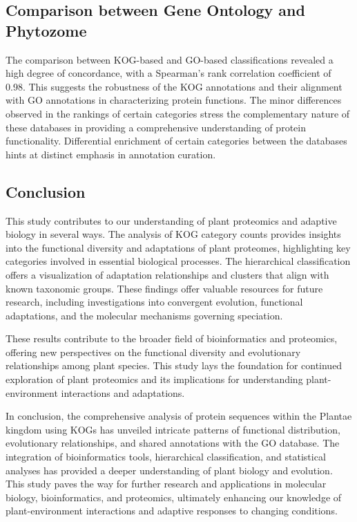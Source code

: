 \subsection{Comparison between Gene Ontology and Phytozome}
\label{sec:conclusion.comparison}

The comparison between KOG-based and GO-based 
classifications revealed a high degree of concordance, 
with a Spearman's rank correlation coefficient of 0.98. 
This suggests the robustness of the KOG annotations and 
their alignment with GO annotations in characterizing 
protein functions. The minor differences observed in the 
rankings of certain categories stress the complementary 
nature of these databases in providing a comprehensive 
understanding of protein functionality. Differential 
enrichment of certain categories between the databases 
hints at distinct emphasis in annotation curation.


\subsection{Conclusion}
\label{sec:conclusion.conclusion}

This study contributes to our understanding of plant 
proteomics and adaptive biology in several ways. The 
analysis of KOG category counts provides insights into 
the functional diversity and adaptations of plant 
proteomes, highlighting key categories involved in 
essential biological processes. The hierarchical 
classification offers a visualization of adaptation 
relationships and clusters that align with known 
taxonomic groups. These findings offer valuable 
resources for future research, including investigations 
into convergent evolution, functional adaptations, and the 
molecular mechanisms governing speciation.

These results contribute to the broader field of 
bioinformatics and proteomics, offering new perspectives on 
the functional diversity and evolutionary relationships 
among plant species. This study lays the foundation for 
continued exploration of plant proteomics and its 
implications for understanding plant-environment 
interactions and adaptations.

In conclusion, the comprehensive analysis of protein 
sequences within the Plantae kingdom using KOGs has 
unveiled intricate patterns of functional distribution, 
evolutionary relationships, and shared annotations with 
the GO database. The integration of bioinformatics tools, 
hierarchical classification, and statistical analyses has 
provided a deeper understanding of plant biology and evolution. 
This study paves the way for further research and 
applications in molecular biology, bioinformatics, and 
proteomics, ultimately enhancing our knowledge of 
plant-environment interactions and adaptive responses to 
changing conditions.
